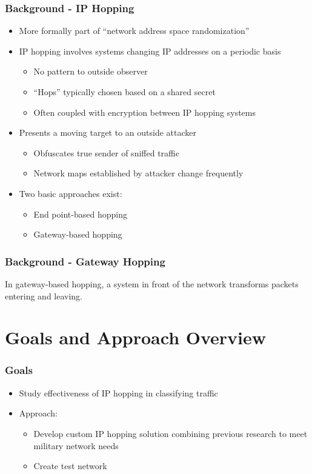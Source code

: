 \documentclass{beamer}
\begin{document}
\begin{frame}
	\frametitle{Background - IP Hopping}
	\begin{itemize}
	\item More formally part of ``network address space randomization''
	\item IP hopping involves systems changing IP addresses on a periodic basis
		\begin{itemize}
		\item No pattern to outside observer
		\item ``Hops'' typically chosen based on a shared secret
		\item Often coupled with encryption between IP hopping systems
		\end{itemize}
	\item Presents a moving target to an outside attacker
		\begin{itemize}
		\item Obfuscates true sender of sniffed traffic
		\item Network maps established by attacker change frequently
		\end{itemize}
	\item Two basic approaches exist:
		\begin{itemize}
		\item End point-based hopping
		\item Gateway-based hopping
		\end{itemize}
	\end{itemize}
\end{frame}

\begin{frame}
	\frametitle{Background - Gateway Hopping}
	In gateway-based hopping, a system in front of the network transforms
	packets entering and leaving.

	\noindent{}
\end{frame}

\section{Goals and Approach Overview}
\begin{frame}
	\frametitle{Goals}

	\begin{itemize}
	\item Study effectiveness of IP hopping in classifying traffic
	\item Approach:
		\begin{itemize}
		\item Develop custom IP hopping solution combining previous research to meet military network needs
		\item Create test network
		\end{itemize}
	\end{itemize}
\end{frame}
\end{document}
